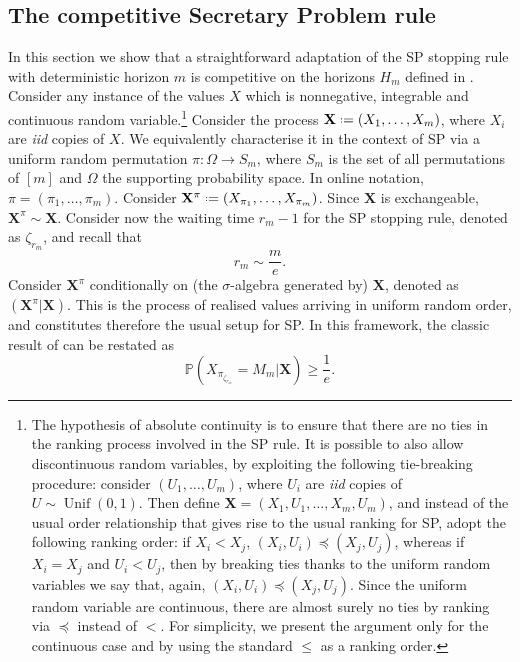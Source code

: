 \documentclass[11pt, a4paper, twoside]{article}
\newcommand*{\defeq}{\mathrel{\vcenter{\baselineskip0.5ex \lineskiplimit0pt
			\hbox{\scriptsize.}\hbox{\scriptsize.}}}=}
\newcommand{\PP}{\mathbb{P}}
\newcommand{\XX}{\mathbf{X}}
\DeclareMathOperator{\Unif}{Unif}
\numberwithin{equation}{section}
\begin{document}
	\subsection{The competitive Secretary Problem rule}
	In this section we show that a straightforward adaptation of the SP stopping rule with deterministic horizon $m$ is competitive on the horizons $H_m$ defined in . Consider any instance of the values $X$ which is nonnegative, integrable and continuous random variable.\footnote{The hypothesis of absolute continuity is to ensure that there are no ties in the ranking process involved in the SP rule. It is possible to also allow discontinuous random variables, by exploiting the following tie-breaking procedure: consider $(U_1,\ldots,U_m)$, where $U_i$ are \textit{iid} copies of $U\sim\Unif(0,1)$. Then define $\XX=(X_1,U_1,\ldots,X_m,U_m)$, and instead of the usual order relationship that gives rise to the usual ranking for SP, adopt the following ranking order: if $X_i<X_j$, $(X_i,U_i)\preccurlyeq(X_j,U_j)$, whereas if $X_i=X_j$ and $U_i<U_j$, then by breaking ties thanks to the uniform random variables we say that, again, $(X_i,U_i)\preccurlyeq(X_j,U_j)$. Since the uniform random variable are continuous, there are almost surely no ties by ranking via $\preccurlyeq$ instead of $<$. For simplicity, we present the argument only for the continuous case and by using the standard $\le$ as a ranking order.} Consider the process $\XX\defeq(X_1,\ldots,X_m)$, where $X_i$ are \textit{iid} copies of $X$. We equivalently characterise it in the context of SP via a uniform random permutation $\pi:\Omega\longrightarrow S_m$, where $S_m$ is the set of all permutations of $[m]$ and $\Omega$ the supporting probability space. In online notation, $\pi=(\pi_1,\ldots,\pi_m)$. Consider $\XX^\pi\defeq(X_{\pi_1},\ldots,X_{\pi_m})$. Since $\XX$ is exchangeable, $\XX^\pi\sim\XX$. Consider now the waiting time $r_m-1$ for the SP stopping rule, denoted as $\zeta_{r_m}$, and recall that
	\begin{equation}\label{waitingtime}
		r_m\sim \frac{m}{e}.
	\end{equation}
	Consider $\XX^\pi$ conditionally on (the $\sigma$-algebra generated by) $\XX$, denoted as $(\XX^\pi|\XX)$. This is the process of realised values arriving in uniform random order, and constitutes therefore the usual setup for SP. In this framework, the classic result of \cite{Lind61} can be restated as 
	\begin{equation}\label{1/e}
		\PP\left(X_{\pi_{\zeta_{r_m}}}=M_m|\XX\right)\ge \frac{1}{e}.
	\end{equation} 
\end{document}
